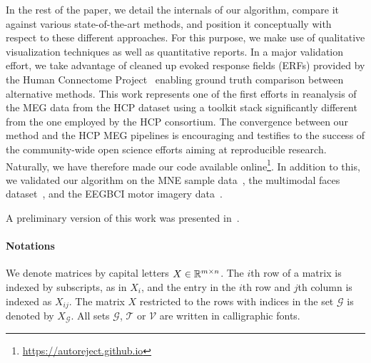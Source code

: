 In the rest of the paper, we detail the internals of our algorithm, compare it against various state-of-the-art methods, and position it conceptually with respect to these different approaches. For this purpose, we make use of qualitative visualization techniques as well as quantitative reports. In a major validation effort, we take advantage of cleaned up evoked response fields (ERFs) provided by the Human Connectome Project~\citep{larson2013adding} enabling ground truth comparison between alternative methods. This work represents one of the first efforts in reanalysis of the MEG data from the HCP dataset using a toolkit stack significantly different from the one employed by the HCP consortium. The convergence between our method and the HCP MEG pipelines is encouraging and testifies to the success of the community-wide open science efforts aiming at reproducible research. Naturally, we have therefore made our code available online\footnote{\url{https://autoreject.github.io}}. In addition to this, we validated our algorithm on the MNE sample data~\citep{gramfort2013meg}, the multimodal faces dataset~\citep{wakeman2015multi}, and the EEGBCI motor imagery data~\citep{goldberger2000physiobank,schalk2004bci2000}.

A preliminary version of this work was presented in~\citet{jas2016automated}.
\paragraph{Notations} We denote matrices by capital letters $X \in \mathbb{R}^{m \times n}$. The $i$th row of a matrix is indexed by subscripts, as in $X_{i}$, and the entry in the $i$th row and $j$th column is indexed as $X_{ij}$. The matrix $X$ restricted to the rows with indices in the set $\mathcal{G}$ is denoted by $X_\mathcal{G}$. All sets $\mathcal{G}$, $\mathcal{T}$ or $\mathcal{V}$ are written in calligraphic fonts.
